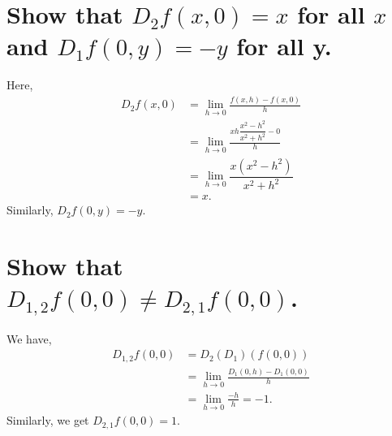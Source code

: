 \begin{parts}
    \part{
        Show that $D_2f(x,0)=x$ for all
        $x$ and $D_1f(0,y)=-y$ for all
        y.
    }
    \begin{solution}
        Here,
        \begin{align*}
            D_2f(x,0)&=\lim_{h\to 0}{
                \frac{f(x,h)-f(x,0)}
                {h}
            }\\
            &=\lim_{h\to 0}{
            \frac{xh\dfrac{x^2-h^2
            }{x^2+h^2}-0}{h}}\\
            &=\lim_{h\to 0}{\dfrac
            {x(x^2-h^2)}{x^2+h^2}}\\
            &=x.
        \end{align*}
        Similarly, $D_2f(0,y)=-y$.
    \end{solution}

    \part{
        Show that $D_{1,2}f(0,0)
        \ne D_{2,1}
        f(0,0)$.
    }
    \begin{solution}
        We have,
        \begin{align*}
            D_{1,2}f(0,0)&=D_2(D_1)
            (f(0,0))\\
            &=\lim_{h\to 0}
            {\frac{D_1(0,h)-D_1(0,0)}
            {h}}\\
            &=\lim_{h\to 0}{\frac
            {-h}{h}}=-1.
        \end{align*}
        Similarly, we get $D_{2,1}
        f(0,0)=1$.
    \end{solution}
\end{parts}
